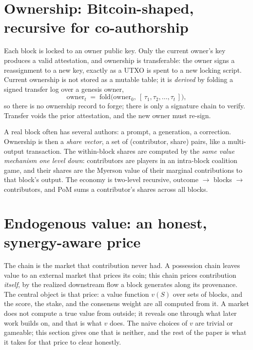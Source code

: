 \documentclass[10pt]{article}
\begin{document}
\section{Ownership: Bitcoin-shaped, recursive for co-authorship}

Each block is locked to an owner public key. Only the current owner's key produces a valid
attestation, and ownership is transferable: the owner signs a reassignment to a new key, exactly as a
UTXO is spent to a new locking script. Current ownership is not stored as a mutable table; it is
\emph{derived} by folding a signed transfer log over a genesis owner,
\begin{equation}
\mathrm{owner}_t \;=\; \mathrm{fold}\big(\mathrm{owner}_0,\ [\,\tau_1, \tau_2, \dots, \tau_t\,]\big),
\end{equation}
so there is no ownership record to forge; there is only a signature chain to verify. Transfer voids
the prior attestation, and the new owner must re-sign.

A real block often has several authors: a prompt, a generation, a correction. Ownership is then a
\emph{share vector}, a set of (contributor, share) pairs, like a multi-output transaction. The
within-block shares are computed by the \emph{same value mechanism one level down}: contributors are
players in an intra-block coalition game, and their shares are the Myerson value of their marginal
contributions to that block's output. The economy is two-level recursive, outcome $\to$ blocks $\to$
contributors, and PoM sums a contributor's shares across all blocks.

\section{Endogenous value: an honest, synergy-aware price}
\label{sec:value}

The chain is the market that contribution never had. A possession chain leaves value to an external
market that prices its coin; this chain prices contribution \emph{itself}, by the realized downstream
flow a block generates along its provenance. The central object is that price: a value function $v(S)$
over sets of blocks, and the score, the stake, and the consensus weight are all computed from it. A
market does not compute a true value from outside; it reveals one through what later work builds on, and
that is what $v$ does. The naive choices of $v$ are trivial or gameable; this section gives one that is
neither, and the rest of the paper is what it takes for that price to clear honestly.
\end{document}
